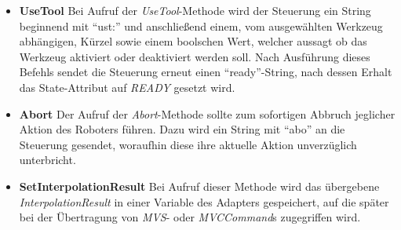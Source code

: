 \begin{itemize}
\item \textbf{UseTool}
\newline
Bei Aufruf der \textit{UseTool}-Methode wird der Steuerung ein String beginnend mit “ust:” und anschließend einem, vom ausgewählten Werkzeug abhängigen, Kürzel sowie einem boolschen Wert, welcher aussagt ob das Werkzeug aktiviert oder deaktiviert werden soll. Nach Ausführung dieses Befehls sendet die Steuerung erneut einen “ready”-String, nach dessen Erhalt das State-Attribut auf \textit{READY} gesetzt wird. 
\item \textbf{Abort}
\newline
Der Aufruf der \textit{Abort}-Methode sollte zum sofortigen Abbruch jeglicher Aktion des Roboters führen. Dazu wird ein String mit “abo” an die Steuerung gesendet, woraufhin diese ihre aktuelle Aktion unverzüglich unterbricht.
\item \textbf{SetInterpolationResult}
\newline
Bei Aufruf dieser Methode wird das übergebene \textit{InterpolationResult} in einer Variable des Adapters gespeichert, auf die später bei der Übertragung von \textit{MVS}- oder \textit{MVCCommand}s zugegriffen wird.
\end{itemize}

